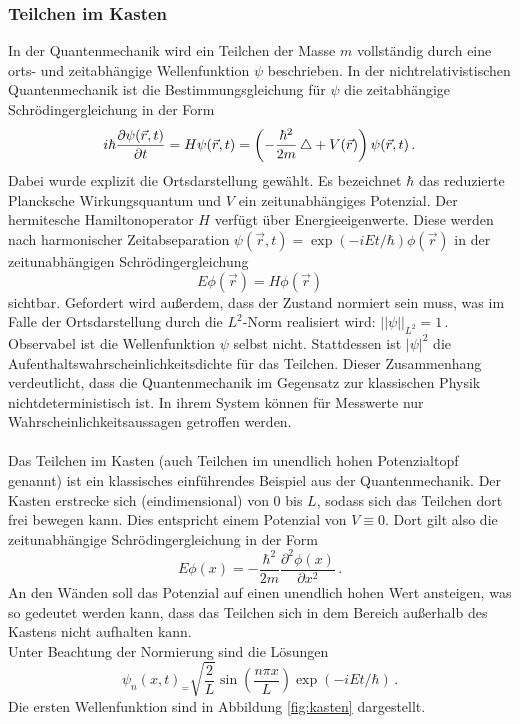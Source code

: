 \subsubsection{Teilchen im Kasten}
\label{subsubsec:kasten}
In der Quantenmechanik wird ein Teilchen der Masse $m$ vollständig durch eine orts- und zeitabhängige Wellenfunktion $\psi$ beschrieben. In der nichtrelativistischen Quantenmechanik ist die Bestimmungsgleichung für $\psi$ die zeitabhängige Schrödingergleichung in der Form
\begin{equation}
  i \hbar \frac{\partial \psi(\vec{r},t)}{\partial t} = H \psi(\vec{r},t) = \left(- \frac{\hbar^2}{2 m} \mathop{}\!\mathbin\bigtriangleup + V(\vec{r})\right) \psi(\vec{r},t)\,.
  \label{eqn:schroedingerZeitabhaengig}
\end{equation}
Dabei wurde explizit die Ortsdarstellung gewählt. Es bezeichnet $\hbar$ das reduzierte Plancksche Wirkungsquantum und $V$ ein zeitunabhängiges Potenzial. Der hermitesche Hamiltonoperator $H$ verfügt über Energieeigenwerte. Diese werden nach harmonischer Zeitabseparation $\psi(\vec{r},t) = \exp(-i E t / \hbar) \phi(\vec{r})$ in der zeitunabhängigen Schrödingergleichung
\begin{equation}
  E \phi(\vec{r}) = H \phi(\vec{r})
  \label{eqn:schroedingerZeitunabhaengig}
\end{equation}
sichtbar. Gefordert wird außerdem, dass der Zustand normiert sein muss, was im Falle der Ortsdarstellung durch die $L^2$-Norm realisiert wird: $\lvert\lvert \psi \rvert\rvert_{L^2} = 1\,.$ Observabel ist die Wellenfunktion $\psi$ selbst nicht. Stattdessen ist $\lvert \psi \rvert ^2$ die Aufenthaltswahrscheinlichkeitsdichte für das Teilchen. Dieser Zusammenhang verdeutlicht, dass die Quantenmechanik im Gegensatz zur klassischen Physik nichtdeterministisch ist. In ihrem System können für Messwerte nur Wahrscheinlichkeitsaussagen getroffen werden.
\\\\
Das Teilchen im Kasten (auch Teilchen im unendlich hohen Potenzialtopf genannt) ist ein klassisches einführendes Beispiel aus der Quantenmechanik. Der Kasten erstrecke sich (eindimensional) von 0 bis $L$, sodass sich das Teilchen dort frei bewegen kann. Dies entspricht einem Potenzial von $V \equiv 0$. Dort gilt also die zeitunabhängige Schrödingergleichung in der Form
\begin{equation}
  E \phi(x) = - \frac{\hbar^2}{2 m}  \frac{\partial^2 \phi(x)} {\partial x^2} \,.
  \label{eqn:schroedingerKasten}
\end{equation}
An den Wänden soll das Potenzial auf einen unendlich hohen Wert ansteigen, was so gedeutet werden kann, dass das Teilchen sich in dem Bereich außerhalb des Kastens nicht aufhalten kann.\\
Unter Beachtung der Normierung sind die Lösungen
\begin{equation}
  \psi_n(x,t)_ = \sqrt{\frac{2}{L}} \sin\left(\frac{n \pi x}{L}\right) \exp(-i E t / \hbar)\,.
  \label{eqn:kastenLoesung}
\end{equation}
Die ersten Wellenfunktion sind in Abbildung \ref{fig:kasten} dargestellt.

